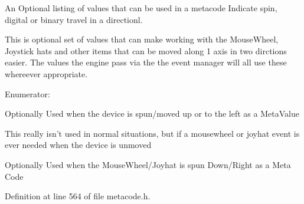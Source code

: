 An Optional listing of values that can be used in a metacode Indicate spin, digital or binary travel in a directionl. 

This is optional set of values that can make working with the MouseWheel, Joystick hats and other items that can be moved along 1 axis in two dirctions easier. The values the engine pass via the the event manager will all use these whereever appropriate. \begin{Desc}
\item[Enumerator: ]\par
\begin{description}
\item[{\em 
\hypertarget{classphys_1_1MetaCode_ad6ed6266b5f4219a6f5da29ebe018757ae4b09c3b8e79b189d9fbc2ea8a1bcade}{
DIRECTIONALMOTION\_\-UPLEFT}
\label{classphys_1_1MetaCode_ad6ed6266b5f4219a6f5da29ebe018757ae4b09c3b8e79b189d9fbc2ea8a1bcade}
}]Optionally Used when the device is spun/moved up or to the left as a MetaValue \item[{\em 
\hypertarget{classphys_1_1MetaCode_ad6ed6266b5f4219a6f5da29ebe018757a01bfdb29aaa2cb816b704667d5cc348f}{
DIRECTIONALMOTION\_\-UNCHANGED}
\label{classphys_1_1MetaCode_ad6ed6266b5f4219a6f5da29ebe018757a01bfdb29aaa2cb816b704667d5cc348f}
}]This really isn't used in normal situations, but if a mousewheel or joyhat event is ever needed when the device is unmoved \item[{\em 
\hypertarget{classphys_1_1MetaCode_ad6ed6266b5f4219a6f5da29ebe018757af4a101f9bcd1baedca43bacd3845eb41}{
DIRECTIONALMOTION\_\-DOWNRIGHT}
\label{classphys_1_1MetaCode_ad6ed6266b5f4219a6f5da29ebe018757af4a101f9bcd1baedca43bacd3845eb41}
}]Optionally Used when the MouseWheel/Joyhat is spun Down/Right as a Meta Code \end{description}
\end{Desc}



Definition at line 564 of file metacode.h.

